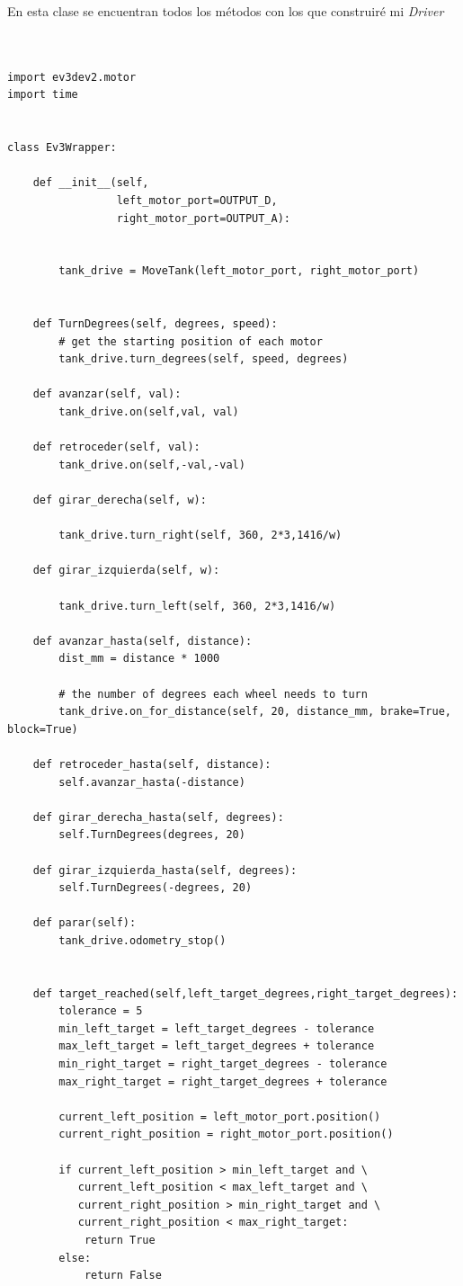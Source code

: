 En esta clase se encuentran todos los métodos con los que construiré mi \textit{Driver}


\begin{lstlisting}[frame=single,breaklines=true, label=Driver Actuadores, caption=Drivers,  captionpos=b]


import ev3dev2.motor
import time


class Ev3Wrapper:

    def __init__(self,
                 left_motor_port=OUTPUT_D,
                 right_motor_port=OUTPUT_A):


        tank_drive = MoveTank(left_motor_port, right_motor_port)


    def TurnDegrees(self, degrees, speed):
        # get the starting position of each motor
        tank_drive.turn_degrees(self, speed, degrees)

    def avanzar(self, val):
        tank_drive.on(self,val, val)

    def retroceder(self, val):
        tank_drive.on(self,-val,-val)

    def girar_derecha(self, w):

        tank_drive.turn_right(self, 360, 2*3,1416/w)

    def girar_izquierda(self, w):

        tank_drive.turn_left(self, 360, 2*3,1416/w)

    def avanzar_hasta(self, distance):
        dist_mm = distance * 1000

        # the number of degrees each wheel needs to turn
        tank_drive.on_for_distance(self, 20, distance_mm, brake=True, block=True)

    def retroceder_hasta(self, distance):
        self.avanzar_hasta(-distance)

    def girar_derecha_hasta(self, degrees):
        self.TurnDegrees(degrees, 20)

    def girar_izquierda_hasta(self, degrees):
        self.TurnDegrees(-degrees, 20)

    def parar(self):
        tank_drive.odometry_stop()


    def target_reached(self,left_target_degrees,right_target_degrees):
        tolerance = 5
        min_left_target = left_target_degrees - tolerance
        max_left_target = left_target_degrees + tolerance
        min_right_target = right_target_degrees - tolerance
        max_right_target = right_target_degrees + tolerance

        current_left_position = left_motor_port.position()
        current_right_position = right_motor_port.position()

        if current_left_position > min_left_target and \
           current_left_position < max_left_target and \
           current_right_position > min_right_target and \
           current_right_position < max_right_target:
            return True
        else:
            return False
\end{lstlisting}


